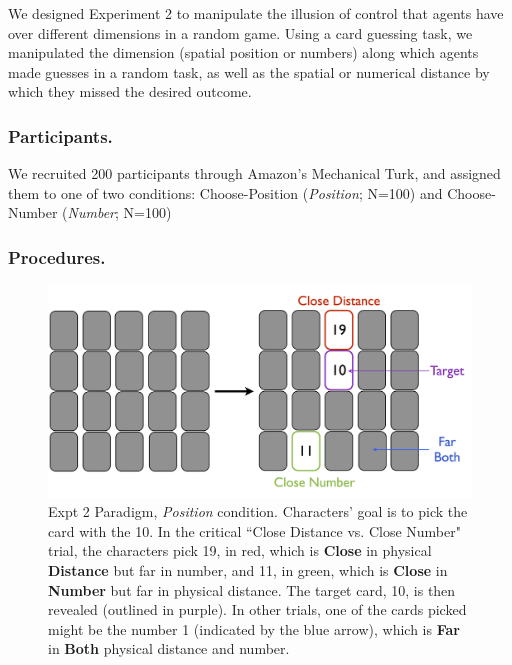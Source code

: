 \documentclass[10pt,letterpaper]{article}
\begin{document}
We designed Experiment 2 to manipulate the illusion of control that agents have over different dimensions in a random game. Using a card guessing task, we manipulated the dimension (spatial position or numbers) along which agents made guesses in a random task, as well as the spatial or numerical distance by which they missed the desired outcome.  


\subsubsection{Participants.} We recruited 200 participants through Amazon's Mechanical Turk, and assigned them to one of two conditions: Choose-Position (\textit{Position}; N=100) and Choose-Number (\textit{Number}; N=100)



\subsubsection{Procedures.} 

\begin{figure}[htb!]
\includegraphics[width=\columnwidth]{images/card_paradigm.png}
\caption{ Expt 2 Paradigm, \textit{Position} condition. Characters' goal is to pick the card with the 10. In the critical ``Close Distance vs. Close Number" trial, the characters pick 19, in red, which is \textbf{Close} in physical \textbf{Distance} but far in number, and 11, in green, which is \textbf{Close} in \textbf{Number} but far in physical distance. The target card, 10, is then revealed (outlined in purple). In other trials, one of the cards picked might be the number 1 (indicated by the blue arrow), which is \textbf{Far} in \textbf{Both} physical distance and number. }
\label{Expt2ParadigmFig}
\end{figure}
\end{document}
